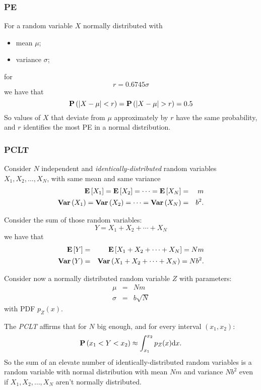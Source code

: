 \documentclass[dissertation.tex]{subfiles}
\begin{document}
\subsubsection{\ac{PE}}
For a random variable $X$ normally distributed with
\begin{itemize}
\item mean $\mu$;
\item variance $\sigma$;
\end{itemize}
for
\begin{equation*}
  r=0.6745\sigma
\end{equation*}
we have that
\begin{equation*}
  \prob{\abs{X-\mu}<r} = \prob{\abs{X-\mu}>r} = 0.5
\end{equation*}
So values of $X$ that deviate from $\mu$ approximately by $r$ have the
same probability, and $r$ identifies the most \ac{PE} in a
normal distribution.
\subsubsection{\acf{PCLT}}
Consider $N$ independent and \emph{identically-distributed} random variables
$X_1,X_2,\dots,X_N$, with same mean and same variance
\begin{eqnarray*}
  \mathrm{\textbf{E}}\left[X_1\right]=\mathrm{\textbf{E}}\left[X_2\right]=\dots=\mathrm{\textbf{E}}\left[X_N\right]&=&m\\
  \mathrm{\textbf{Var}}\left(X_1\right)=\mathrm{\textbf{Var}}\left(X_2\right)=\dots=\mathrm{\textbf{Var}}\left(X_N\right)&=&b^2.
\end{eqnarray*}

Consider the sum of those random variables:
\begin{equation*}
  Y = X_1+X_2+\cdots+X_N
\end{equation*}
we have that
\begin{eqnarray*}
  \mathrm{\textbf{E}}\left[Y\right]&=&\mathrm{\textbf{E}}\left[X_1+X_2+\cdots+X_N\right]=Nm\\
  \mathrm{\textbf{Var}}\left(Y\right)&=&\mathrm{\textbf{Var}}\left(X_1+X_2+\cdots+X_N\right)=Nb^2.
\end{eqnarray*}

Consider now a normally distributed random variable $Z$ with
parameters:
\begin{eqnarray*}
  \mu&=&Nm\\
  \sigma&=&b\sqrt{N}
\end{eqnarray*}
with \ac{PDF} $p_Z(x)$.

The \emph{\ac{PCLT}} affirms that for $N$ big
enough, and for every interval $(x_1,x_2)$:
\begin{equation}\label{eq:tcl}
  \mathrm{\textbf{P}}\left(x_1<Y<x_2\right)\approx\int_{x_1}^{x_2}p_Z(x) \mathrm{d} x.
\end{equation}
So the sum of an elevate number of identically-distributed random
variables is a random variable with normal distribution with mean $Nm$
and variance $Nb^2$ even if
$X_1,X_2,\dots,X_N$ aren't normally distributed.
\end{document}
